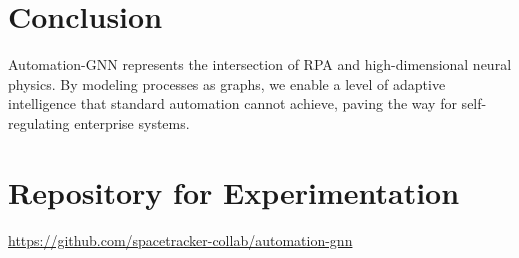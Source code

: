 \documentclass[12pt]{article}
\begin{document}
\section{Conclusion}
Automation-GNN represents the intersection of RPA and high-dimensional neural physics. By modeling processes as graphs, we enable a level of adaptive intelligence that standard automation cannot achieve, paving the way for self-regulating enterprise systems.

\section{Repository for Experimentation}
\noindent
\url{https://github.com/spacetracker-collab/automation-gnn}
\end{document}
